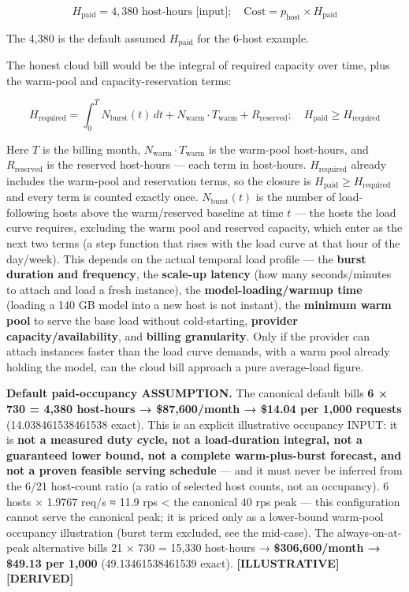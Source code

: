 \[
H_\text{paid} = 4{,}380 \text{ host-hours [input]}; \quad \text{Cost} = p_\text{host} \times H_\text{paid}
\]

The 4,380 is the default assumed \(H_\text{paid}\) for the 6-host
example.

The honest cloud bill would be the integral of required capacity over
time, plus the warm-pool and capacity-reservation terms:

\[
H_\text{required} = \int_0^T N_\text{burst}(t)\,dt + N_\text{warm}\cdot T_\text{warm} + R_\text{reserved}; \quad H_\text{paid} \ge H_\text{required}
\]

Here \(T\) is the billing month, \(N_\text{warm}\cdot T_\text{warm}\) is
the warm-pool host-hours, and \(R_\text{reserved}\) is the reserved
host-hours --- each term in host-hours. \(H_\text{required}\) already
includes the warm-pool and reservation terms, so the closure is
\(H_\text{paid} \ge H_\text{required}\) and every term is counted
exactly once. \(N_\text{burst}(t)\) is the number of load-following
hosts above the warm/reserved baseline at time \(t\) --- the hosts the
load curve requires, excluding the warm pool and reserved capacity,
which enter as the next two terms (a step function that rises with the
load curve at that hour of the day/week). This depends on the actual
temporal load profile --- the \textbf{burst duration and frequency}, the
\textbf{scale-up latency} (how many seconds/minutes to attach and load a
fresh instance), the \textbf{model-loading/warmup time} (loading a 140
GB model into a new host is not instant), the \textbf{minimum warm pool}
to serve the base load without cold-starting, \textbf{provider
capacity/availability}, and \textbf{billing granularity}. Only if the
provider can attach instances faster than the load curve demands, with a
warm pool already holding the model, can the cloud bill approach a pure
average-load figure.

\textbf{Default paid-occupancy ASSUMPTION.} The canonical default bills
\textbf{6 × 730 = 4,380 host-hours → \$87,600/month → \$14.04 per 1,000
requests} (14.038461538461538 exact). This is an explicit illustrative
occupancy INPUT: it is \textbf{not a measured duty cycle, not a
load-duration integral, not a guaranteed lower bound, not a complete
warm-plus-burst forecast, and not a proven feasible serving schedule}
--- and it must never be inferred from the 6/21 host-count ratio (a
ratio of selected host counts, not an occupancy). 6 hosts × 1.9767 req/s
≈ 11.9 rps \textless{} the canonical 40 rps peak --- this configuration
cannot serve the canonical peak; it is priced only as a lower-bound
warm-pool occupancy illustration (burst term excluded, see the
mid-case). The always-on-at-peak alternative bills 21 × 730 = 15,330
host-hours → \textbf{\$306,600/month → \$49.13 per 1,000}
(49.13461538461539 exact). \textbf{\mbox{{[}ILLUSTRATIVE{]}}\hspace{0pt}\mbox{{[}DERIVED{]}}}


